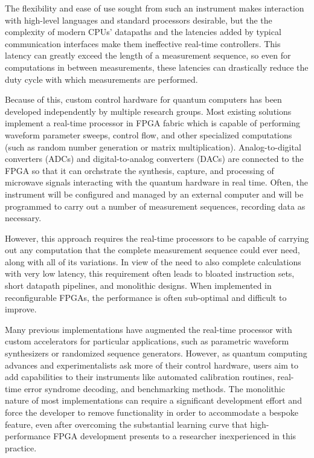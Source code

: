 The flexibility and ease of use sought from such an instrument makes interaction with high-level languages and standard processors desirable, but the the complexity of modern CPUs' datapaths and the latencies added by typical communication interfaces make them ineffective real-time controllers. This latency can greatly exceed the length of a measurement sequence, so even for computations in between measurements, these latencies can drastically reduce the duty cycle with which measurements are performed.

Because of this, custom control hardware for quantum computers has been developed independently by multiple research groups. Most existing solutions implement a real-time processor in FPGA fabric which is capable of performing waveform parameter sweeps, control flow, and other specialized computations (such as random number generation or matrix multiplication). Analog-to-digital converters (ADCs) and digital-to-analog converters (DACs) are connected to the FPGA so that it can orchstrate the synthesis, capture, and processing of microwave signals interacting with the quantum hardware in real time. Often, the instrument will be configured and managed by an external computer and will be programmed to carry out a number of measurement sequences, recording data as necessary. 

However, this approach requires the real-time processors to be capable of carrying out any computation that the complete measurement sequence could ever need, along with all of its variations. In view of the need to also complete calculations with very low latency, this requirement often leads to bloated instruction sets, short datapath pipelines, and monolithic designs. When implemented in reconfigurable FPGAs, the performance is often sub-optimal and difficult to improve.

Many previous implementations have augmented the real-time processor with custom accelerators for particular applications, such as parametric waveform synthesizers or randomized sequence generators. However, as quantum computing advances and experimentalists ask more of their control hardware, users aim to add capabilities to their instruments like automated calibration routines, real-time error syndrome decoding, and benchmarking methods. The monolithic nature of most implementations can require a significant development effort and force the developer to remove functionality in order to accommodate a bespoke feature, even after overcoming the substantial learning curve that high-performance FPGA development presents to a researcher inexperienced in this practice. 

